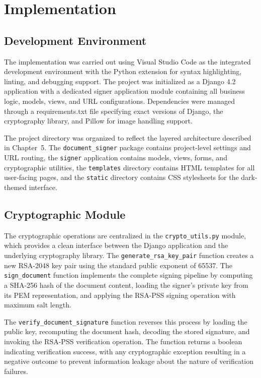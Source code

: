 \chapter{Implementation}

\section{Development Environment}

The implementation was carried out using Visual Studio Code as the integrated development environment with the Python extension for syntax highlighting, linting, and debugging support. The project was initialized as a Django 4.2 application with a dedicated signer application module containing all business logic, models, views, and URL configurations. Dependencies were managed through a requirements.txt file specifying exact versions of Django, the cryptography library, and Pillow for image handling support.

The project directory was organized to reflect the layered architecture described in Chapter~5. The \texttt{document\_signer} package contains project-level settings and URL routing, the \texttt{signer} application contains models, views, forms, and cryptographic utilities, the \texttt{templates} directory contains HTML templates for all user-facing pages, and the \texttt{static} directory contains CSS stylesheets for the dark-themed interface.

\section{Cryptographic Module}

The cryptographic operations are centralized in the \texttt{crypto\_utils.py} module, which provides a clean interface between the Django application and the underlying cryptography library. The \texttt{generate\_rsa\_key\_pair} function creates a new RSA-2048 key pair using the standard public exponent of 65537. The \texttt{sign\_document} function implements the complete signing pipeline by computing a SHA-256 hash of the document content, loading the signer's private key from its PEM representation, and applying the RSA-PSS signing operation with maximum salt length.

The \texttt{verify\_document\_signature} function reverses this process by loading the public key, recomputing the document hash, decoding the stored signature, and invoking the RSA-PSS verification operation. The function returns a boolean indicating verification success, with any cryptographic exception resulting in a negative outcome to prevent information leakage about the nature of verification failures.


